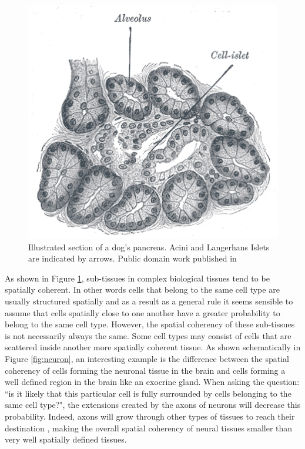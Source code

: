 \begin{figure}[bth]
\begin{center}
  \includegraphics[width=0.8\linewidth]{gfx/chapter1/pancreas.png}
\end{center}
  \caption{Illustrated section of a dog's pancreas. Acini and Langerhans Islets are indicated by arrows. Public domain work published in \cite{williams80}}
  \label{fig:pancreas}
\end{figure}
    
     
    As shown in Figure \ref{fig:pancreas}, sub-tissues in complex biological tissues tend to be spatially coherent. In other words cells that belong to the same cell type are usually structured spatially and as a result as a general rule it seems sensible to assume that cells spatially close to one another have a greater probability to belong to the same cell type. However, the spatial coherency of these sub-tissues is not necessarily always the same. Some cell types may consist of cells that are scattered inside another more spatially coherent tissue. As shown schematically in Figure \ref{fig:neuron}, an interesting example is the difference between the spatial coherency of cells forming the neuronal tissue in the brain and cells forming a well defined region in the brain like an exocrine gland. When asking the question: ``is it likely that this particular cell is fully surrounded by cells belonging to the same cell type?", the extensions created by the axons of neurons will decrease this probability. Indeed, axons will grow through other types of tissues to reach their destination \cite{bartlett84,colello90}, making the overall spatial coherency of neural tissues smaller than very well spatially defined tissues.\\
    
